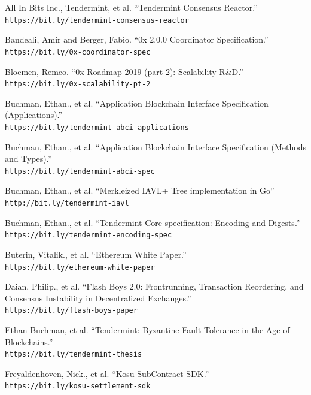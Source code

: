 \documentclass[10pt]{article}
\begin{document}
\begin{thebibliography}{9}

All In Bits Inc., Tendermint, et al. ``Tendermint Consensus Reactor.''
\\\texttt{https://bit.ly/tendermint-consensus-reactor}

Bandeali, Amir and Berger, Fabio. ``0x 2.0.0 Coordinator Specification.''
\\\texttt{https://bit.ly/0x-coordinator-spec}

Bloemen, Remco. ``0x Roadmap 2019 (part 2): Scalability R\&D.''
\\\texttt{https://bit.ly/0x-scalability-pt-2}

Buchman, Ethan., et al. ``Application Blockchain Interface Specification (Applications).''
\\\texttt{https://bit.ly/tendermint-abci-applications}

Buchman, Ethan., et al. ``Application Blockchain Interface Specification (Methods and Types).''
\\\texttt{https://bit.ly/tendermint-abci-spec}

Buchman, Ethan., et al. ``Merkleized IAVL+ Tree implementation in Go''
\\\texttt{http://bit.ly/tendermint-iavl}

Buchman, Ethan., et al. ``Tendermint Core specification: Encoding and Digests.''
\\\texttt{https://bit.ly/tendermint-encoding-spec}

Buterin, Vitalik., et al. ``Ethereum White Paper.''
\\\texttt{https://bit.ly/ethereum-white-paper}

Daian, Philip., et al. ``Flash Boys 2.0: Frontrunning, Transaction Reordering, and Consensus Instability in Decentralized Exchanges.''
\\\texttt{https://bit.ly/flash-boys-paper}

Ethan Buchman, et al. ``Tendermint: Byzantine Fault Tolerance in the Age of Blockchains.''
\\\texttt{https://bit.ly/tendermint-thesis}

Freyaldenhoven, Nick., et al. ``Kosu SubContract SDK.''
\\\texttt{https://bit.ly/kosu-settlement-sdk}


\end{thebibliography}
\end{document}

